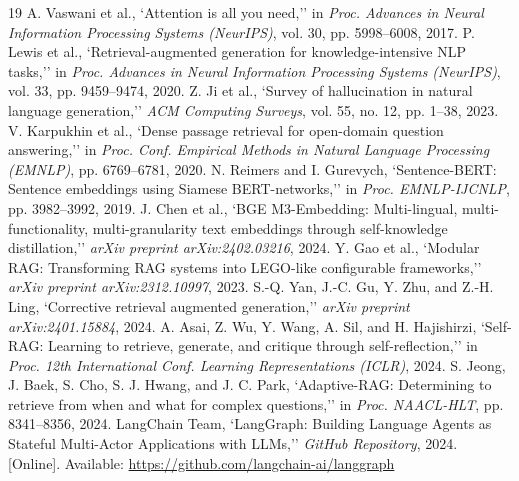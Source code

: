 \documentclass[conference]{IEEEtran}
\begin{document}
\begin{thebibliography}{19}
 A. Vaswani et al., `Attention is all you need,'' in \textit{Proc. Advances in Neural Information Processing Systems (NeurIPS)}, vol. 30, pp. 5998--6008, 2017.
 P. Lewis et al., `Retrieval-augmented generation for knowledge-intensive NLP tasks,'' in \textit{Proc. Advances in Neural Information Processing Systems (NeurIPS)}, vol. 33, pp. 9459--9474, 2020.
 Z. Ji et al., `Survey of hallucination in natural language generation,'' \textit{ACM Computing Surveys}, vol. 55, no. 12, pp. 1--38, 2023.
 V. Karpukhin et al., `Dense passage retrieval for open-domain question answering,'' in \textit{Proc. Conf. Empirical Methods in Natural Language Processing (EMNLP)}, pp. 6769--6781, 2020.
 N. Reimers and I. Gurevych, `Sentence-BERT: Sentence embeddings using Siamese BERT-networks,'' in \textit{Proc. EMNLP-IJCNLP}, pp. 3982--3992, 2019.
 J. Chen et al., `BGE M3-Embedding: Multi-lingual, multi-functionality, multi-granularity text embeddings through self-knowledge distillation,'' \textit{arXiv preprint arXiv:2402.03216}, 2024.
 Y. Gao et al., `Modular RAG: Transforming RAG systems into LEGO-like configurable frameworks,'' \textit{arXiv preprint arXiv:2312.10997}, 2023.
 S.-Q. Yan, J.-C. Gu, Y. Zhu, and Z.-H. Ling, `Corrective retrieval augmented generation,'' \textit{arXiv preprint arXiv:2401.15884}, 2024.
 A. Asai, Z. Wu, Y. Wang, A. Sil, and H. Hajishirzi, `Self-RAG: Learning to retrieve, generate, and critique through self-reflection,'' in \textit{Proc. 12th International Conf. Learning Representations (ICLR)}, 2024.
 S. Jeong, J. Baek, S. Cho, S. J. Hwang, and J. C. Park, `Adaptive-RAG: Determining to retrieve from when and what for complex questions,'' in \textit{Proc. NAACL-HLT}, pp. 8341--8356, 2024.
 LangChain Team, `LangGraph: Building Language Agents as Stateful Multi-Actor Applications with LLMs,'' \textit{GitHub Repository}, 2024. [Online]. Available: \url{https://github.com/langchain-ai/langgraph}

\end{thebibliography}
\end{document}
